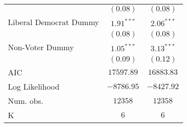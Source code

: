 \begin{center}
\begin{longtable}[H]{l c c}
                         & $(0.08)$      & $(0.08)$      \\
Liberal Democrat Dummy   & $1.91^{***}$  & $2.06^{***}$  \\
                         & $(0.08)$      & $(0.08)$      \\
Non-Voter Dummy          & $1.05^{***}$  & $3.13^{***}$  \\
                         & $(0.09)$      & $(0.12)$      \\
\hline
AIC                      & $17597.89$    & $16883.83$    \\
Log Likelihood           & $-8786.95$    & $-8427.92$    \\
Num. obs.                & $12358$       & $12358$       \\
K                        & $6$           & $6$           \\
\end{longtable}
\end{center}

